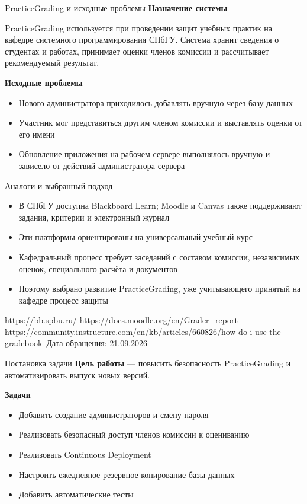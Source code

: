 \documentclass[aspectratio=169]{beamer}
\begin{document}
\begin{frame}{PracticeGrading и исходные проблемы}
  \textbf{Назначение системы}

  PracticeGrading используется при проведении защит учебных практик
  на кафедре системного программирования СПбГУ.
  Система хранит сведения о студентах и работах, принимает оценки
  членов комиссии и рассчитывает рекомендуемый результат.

  \vspace{0.8em}
  \textbf{Исходные проблемы}

  \begin{itemize}
    \item Нового администратора приходилось добавлять вручную
      через базу данных
    \item Участник мог представиться другим членом комиссии
      и выставлять оценки от его имени
    \item Обновление приложения на рабочем сервере выполнялось вручную
      и зависело от действий администратора сервера
  \end{itemize}
\end{frame}
\begin{frame}{Аналоги и выбранный подход}
  \begin{itemize}
    \item В СПбГУ доступна Blackboard Learn; Moodle и Canvas также
      поддерживают задания, критерии и электронный журнал
    \item Эти платформы ориентированы на универсальный учебный курс
    \item Кафедральный процесс требует заседаний с составом комиссии,
      независимых оценок, специального расчёта и документов
    \item Поэтому выбрано развитие PracticeGrading, уже учитывающего
      принятый на кафедре процесс защиты
  \end{itemize}

  \vfill
  \tiny
  \url{https://bb.spbu.ru/}\quad
  \url{https://docs.moodle.org/en/Grader_report}\quad
  \url{https://community.instructure.com/en/kb/articles/660826/how-do-i-use-the-gradebook}\
  Дата обращения: 21.09.2026
\end{frame}

\begin{frame}{Постановка задачи}
  \textbf{Цель работы} --- повысить безопасность PracticeGrading
  и автоматизировать выпуск новых версий.

  \vspace{1em}
  \textbf{Задачи}
  \begin{itemize}
    \item Добавить создание администраторов и смену пароля
    \item Реализовать безопасный доступ членов комиссии к оцениванию
    \item Реализовать Continuous Deployment
    \item Настроить ежедневное резервное копирование базы данных
    \item Добавить автоматические тесты
  \end{itemize}
\end{frame}
\end{document}
